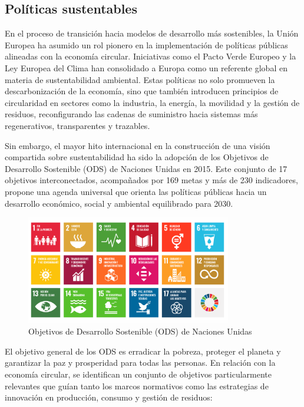 \subsection{Políticas sustentables}

En el proceso de transición hacia modelos de desarrollo más sostenibles, la Unión Europea ha asumido un rol pionero en la implementación de políticas públicas alineadas con la economía circular. Iniciativas como el Pacto Verde Europeo y la Ley Europea del Clima han consolidado a Europa como un referente global en materia de sustentabilidad ambiental. Estas políticas no solo promueven la descarbonización de la economía, sino que también introducen principios de circularidad en sectores como la industria, la energía, la movilidad y la gestión de residuos, reconfigurando las cadenas de suministro hacia sistemas más regenerativos, transparentes y trazables.

Sin embargo, el mayor hito internacional en la construcción de una visión compartida sobre sustentabilidad ha sido la adopción de los Objetivos de Desarrollo Sostenible (ODS) de Naciones Unidas en 2015. Este conjunto de 17 objetivos interconectados, acompañados por 169 metas y más de 230 indicadores, propone una agenda universal que orienta las políticas públicas hacia un desarrollo económico, social y ambiental equilibrado para 2030.

\begin{figure}[!tb]
    \centering
    \includegraphics[width=0.8\textwidth]{Figures/ods.png}
    \caption{Objetivos de Desarrollo Sostenible (ODS) de Naciones Unidas}
    \label{fig:ods}
\end{figure}

El objetivo general de los ODS es erradicar la pobreza, proteger el planeta y garantizar la paz y prosperidad para todas las personas. En relación con la economía circular, se identifican un conjunto de objetivos particularmente relevantes que guían tanto los marcos normativos como las estrategias de innovación en producción, consumo y gestión de residuos:

